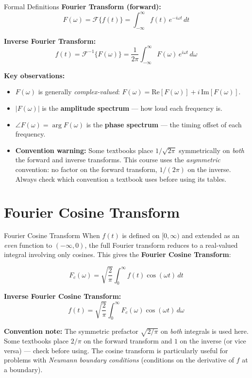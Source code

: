 \documentclass[12pt,a4paper]{article}
\begin{document}
\begin{infobox}{Formal Definitions}
\textbf{Fourier Transform (forward):}
\[
  F(\omega) = \mathcal{F}\{f(t)\}
             = \int_{-\infty}^{\infty} f(t)\,e^{-i\omega t}\,dt
\]

\textbf{Inverse Fourier Transform:}
\[
  f(t) = \mathcal{F}^{-1}\{F(\omega)\}
       = \frac{1}{2\pi}\int_{-\infty}^{\infty} F(\omega)\,e^{i\omega t}\,d\omega
\]

\textbf{Key observations:}
\begin{itemize}[leftmargin=1.5em]
  \item $F(\omega)$ is generally \emph{complex-valued}: $F(\omega) = \text{Re}[F(\omega)] + i\,\text{Im}[F(\omega)]$.
  \item $|F(\omega)|$ is the \textbf{amplitude spectrum} --- how loud each frequency is.
  \item $\angle F(\omega) = \arg F(\omega)$ is the \textbf{phase spectrum} --- the timing offset of each frequency.
  \item \textbf{Convention warning:} Some textbooks place $1/\sqrt{2\pi}$ symmetrically on \emph{both} the forward
        and inverse transforms.
        This course uses the \emph{asymmetric} convention: no factor on the forward transform,
        $1/(2\pi)$ on the inverse.
        Always check which convention a textbook uses before using its tables.
\end{itemize}
\end{infobox}

\section{Fourier Cosine Transform}

\begin{infobox}{Fourier Cosine Transform}
When $f(t)$ is defined on $[0,\infty)$ and extended as an \emph{even} function to $(-\infty,0)$,
the full Fourier transform reduces to a real-valued integral involving only cosines.
This gives the \textbf{Fourier Cosine Transform}:

\[
  F_c(\omega) = \sqrt{\frac{2}{\pi}}\int_0^\infty f(t)\cos(\omega t)\,dt
\]

\textbf{Inverse Fourier Cosine Transform:}
\[
  f(t) = \sqrt{\frac{2}{\pi}}\int_0^\infty F_c(\omega)\cos(\omega t)\,d\omega
\]

\textbf{Convention note:} The symmetric prefactor $\sqrt{2/\pi}$ on \emph{both} integrals is used here.
Some textbooks place $2/\pi$ on the forward transform and $1$ on the inverse (or vice versa) ---
check before using.
The cosine transform is particularly useful for problems with \emph{Neumann boundary conditions}
(conditions on the derivative of $f$ at a boundary).
\end{infobox}
\end{document}

